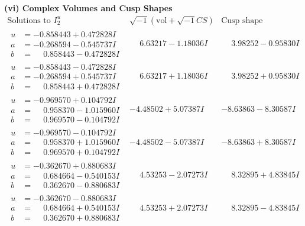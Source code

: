 \documentclass[1p]{elsarticle_modified}
\theoremstyle{definition}
\newcommand{\I}{\sqrt{-1}}
\begin{document}
\newpage\flushleft \textbf{(vi) Complex Volumes and Cusp Shapes}
$$\begin{array}{c|c|c}  
\text{Solutions to }I^u_{2}& \I (\text{vol} + \sqrt{-1}CS) & \text{Cusp shape}\\
 \hline 
\begin{aligned}
u &= -0.858443 + 0.472828 I \\
a &= -0.268594 - 0.545737 I \\
b &= \phantom{-}0.858443 - 0.472828 I\end{aligned}
 & \phantom{-}6.63217 - 1.18036 I & \phantom{-}3.98252 - 0.95830 I \\ \hline\begin{aligned}
u &= -0.858443 - 0.472828 I \\
a &= -0.268594 + 0.545737 I \\
b &= \phantom{-}0.858443 + 0.472828 I\end{aligned}
 & \phantom{-}6.63217 + 1.18036 I & \phantom{-}3.98252 + 0.95830 I \\ \hline\begin{aligned}
u &= -0.969570 + 0.104792 I \\
a &= \phantom{-}0.958370 - 1.015960 I \\
b &= \phantom{-}0.969570 - 0.104792 I\end{aligned}
 & -4.48502 + 5.07387 I & -8.63863 - 8.30587 I \\ \hline\begin{aligned}
u &= -0.969570 - 0.104792 I \\
a &= \phantom{-}0.958370 + 1.015960 I \\
b &= \phantom{-}0.969570 + 0.104792 I\end{aligned}
 & -4.48502 - 5.07387 I & -8.63863 + 8.30587 I \\ \hline\begin{aligned}
u &= -0.362670 + 0.880683 I \\
a &= \phantom{-}0.684664 - 0.540153 I \\
b &= \phantom{-}0.362670 - 0.880683 I\end{aligned}
 & \phantom{-}4.53253 - 2.07273 I & \phantom{-}8.32895 + 4.83845 I \\ \hline\begin{aligned}
u &= -0.362670 - 0.880683 I \\
a &= \phantom{-}0.684664 + 0.540153 I \\
b &= \phantom{-}0.362670 + 0.880683 I\end{aligned}
 & \phantom{-}4.53253 + 2.07273 I & \phantom{-}8.32895 - 4.83845 I \\ \hline\begin{aligned}

\end{aligned}
\end{array}$$
\end{document}
